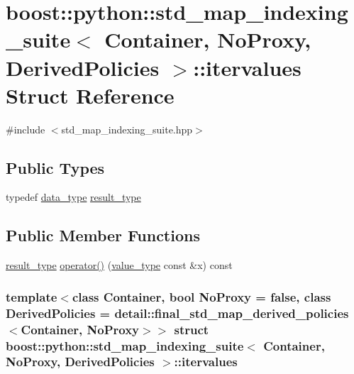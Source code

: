 \hypertarget{structboost_1_1python_1_1std__map__indexing__suite_1_1itervalues}{\section{boost\-:\-:python\-:\-:std\-\_\-map\-\_\-indexing\-\_\-suite$<$ \-Container, \-No\-Proxy, \-Derived\-Policies $>$\-:\-:itervalues \-Struct \-Reference}
\label{structboost_1_1python_1_1std__map__indexing__suite_1_1itervalues}
}


{\ttfamily \#include $<$std\-\_\-map\-\_\-indexing\-\_\-suite.\-hpp$>$}

\subsection*{\-Public \-Types}
\begin{DoxyCompactItemize}
\item 
typedef \hyperlink{classboost_1_1python_1_1std__map__indexing__suite_a3e9a6a8b8ba34759cf0ba99fe5966041}{data\-\_\-type} \hyperlink{structboost_1_1python_1_1std__map__indexing__suite_1_1itervalues_a7d2f8df7d18009f2bad1363db4f718f3}{result\-\_\-type}
\end{DoxyCompactItemize}
\subsection*{\-Public \-Member \-Functions}
\begin{DoxyCompactItemize}
\item 
\hyperlink{structboost_1_1python_1_1std__map__indexing__suite_1_1itervalues_a7d2f8df7d18009f2bad1363db4f718f3}{result\-\_\-type} \hyperlink{structboost_1_1python_1_1std__map__indexing__suite_1_1itervalues_a36486ce19f8e08900aabe582d0502dc8}{operator()} (\hyperlink{classboost_1_1python_1_1std__map__indexing__suite_aff9ed68cf30e805a04a313d92c62ab38}{value\-\_\-type} const \&x) const 
\end{DoxyCompactItemize}
\subsubsection*{template$<$class \-Container, bool \-No\-Proxy = false, class \-Derived\-Policies = detail\-::final\-\_\-std\-\_\-map\-\_\-derived\-\_\-policies$<$\-Container, No\-Proxy$>$$>$ struct boost\-::python\-::std\-\_\-map\-\_\-indexing\-\_\-suite$<$ Container, No\-Proxy, Derived\-Policies $>$\-::itervalues}



